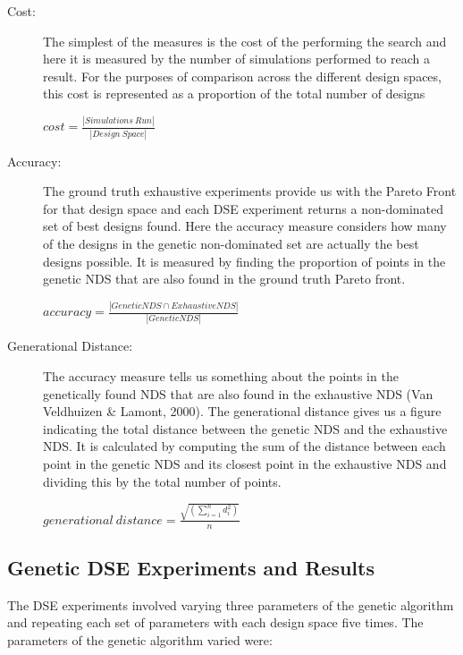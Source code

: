\begin{description}
\item[Cost:] The simplest of the measures is the cost of the performing the search and here it is measured by the number of simulations performed to reach a result. For the purposes of comparison across the different design spaces, this cost is represented as a proportion of the total number of designs

$cost = \frac{|Simulations\ Run|}{|Design\ Space|}$

\item[Accuracy:] The ground truth exhaustive experiments provide us with the Pareto Front for that design space and each DSE experiment returns a non-dominated set of best designs found.  Here the accuracy measure considers how many of the designs in the genetic non-dominated set are actually the best designs possible. It is measured by finding the proportion of points in the genetic NDS that are also found in the ground truth Pareto front.

$accuracy = \frac{|GeneticNDS \cap ExhaustiveNDS|}{|GeneticNDS|}$

\item[Generational Distance:] The accuracy measure tells us something about the points in the genetically found NDS that are also found in the exhaustive NDS (Van Veldhuizen \& Lamont, 2000).  The generational distance gives us a figure indicating the total distance between the genetic NDS and the exhaustive NDS. It is calculated by computing the sum of the distance between each point in the genetic NDS and its closest point in the exhaustive NDS and dividing this by the total number of points.


$generational\ distance = \frac{\sqrt{(\sum_{i=1}^{n} d_{i}^{2})}}{n}$

\end{description}
\subsection{Genetic DSE Experiments and Results}
The DSE experiments involved varying three parameters of the genetic algorithm and repeating each set of parameters with each design space five times.  The parameters of the genetic algorithm varied were:

